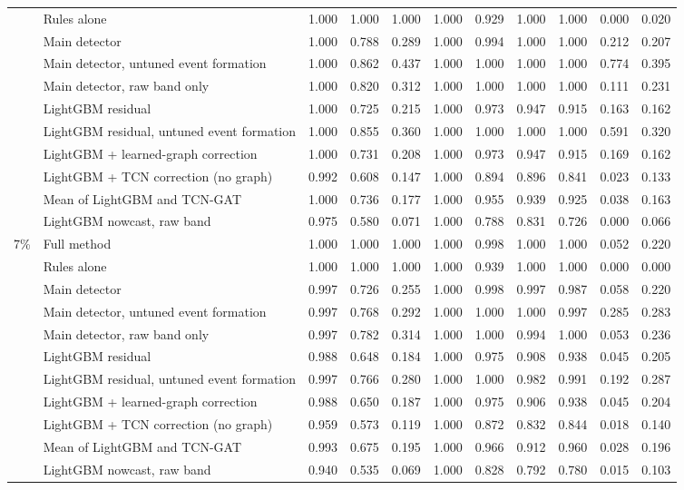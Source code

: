 \documentclass[11pt,a4paper]{article}
\begin{document}
\begin{longtable}{@{}l >{\raggedright\arraybackslash}p{3.9cm} rrrrrrrrr@{}}
 & Rules alone & 1.000 & 1.000 & 1.000 & 1.000 & 0.929 & 1.000 & 1.000 & 0.000 & 0.020 \\
 & Main detector & 1.000 & 0.788 & 0.289 & 1.000 & 0.994 & 1.000 & 1.000 & 0.212 & 0.207 \\
 & Main detector, untuned event formation & 1.000 & 0.862 & 0.437 & 1.000 & 1.000 & 1.000 & 1.000 & 0.774 & 0.395 \\
 & Main detector, raw band only & 1.000 & 0.820 & 0.312 & 1.000 & 1.000 & 1.000 & 1.000 & 0.111 & 0.231 \\
 & LightGBM residual & 1.000 & 0.725 & 0.215 & 1.000 & 0.973 & 0.947 & 0.915 & 0.163 & 0.162 \\
 & LightGBM residual, untuned event formation & 1.000 & 0.855 & 0.360 & 1.000 & 1.000 & 1.000 & 1.000 & 0.591 & 0.320 \\
 & LightGBM + learned-graph correction & 1.000 & 0.731 & 0.208 & 1.000 & 0.973 & 0.947 & 0.915 & 0.169 & 0.162 \\
 & LightGBM + TCN correction (no graph) & 0.992 & 0.608 & 0.147 & 1.000 & 0.894 & 0.896 & 0.841 & 0.023 & 0.133 \\
 & Mean of LightGBM and TCN-GAT & 1.000 & 0.736 & 0.177 & 1.000 & 0.955 & 0.939 & 0.925 & 0.038 & 0.163 \\
 & LightGBM nowcast, raw band & 0.975 & 0.580 & 0.071 & 1.000 & 0.788 & 0.831 & 0.726 & 0.000 & 0.066 \\
\midrule
7\% & Full method & 1.000 & 1.000 & 1.000 & 1.000 & 0.998 & 1.000 & 1.000 & 0.052 & 0.220 \\
 & Rules alone & 1.000 & 1.000 & 1.000 & 1.000 & 0.939 & 1.000 & 1.000 & 0.000 & 0.000 \\
 & Main detector & 0.997 & 0.726 & 0.255 & 1.000 & 0.998 & 0.997 & 0.987 & 0.058 & 0.220 \\
 & Main detector, untuned event formation & 0.997 & 0.768 & 0.292 & 1.000 & 1.000 & 1.000 & 0.997 & 0.285 & 0.283 \\
 & Main detector, raw band only & 0.997 & 0.782 & 0.314 & 1.000 & 1.000 & 0.994 & 1.000 & 0.053 & 0.236 \\
 & LightGBM residual & 0.988 & 0.648 & 0.184 & 1.000 & 0.975 & 0.908 & 0.938 & 0.045 & 0.205 \\
 & LightGBM residual, untuned event formation & 0.997 & 0.766 & 0.280 & 1.000 & 1.000 & 0.982 & 0.991 & 0.192 & 0.287 \\
 & LightGBM + learned-graph correction & 0.988 & 0.650 & 0.187 & 1.000 & 0.975 & 0.906 & 0.938 & 0.045 & 0.204 \\
 & LightGBM + TCN correction (no graph) & 0.959 & 0.573 & 0.119 & 1.000 & 0.872 & 0.832 & 0.844 & 0.018 & 0.140 \\
 & Mean of LightGBM and TCN-GAT & 0.993 & 0.675 & 0.195 & 1.000 & 0.966 & 0.912 & 0.960 & 0.028 & 0.196 \\
 & LightGBM nowcast, raw band & 0.940 & 0.535 & 0.069 & 1.000 & 0.828 & 0.792 & 0.780 & 0.015 & 0.103 \\
\end{longtable}
\endgroup
\end{document}
